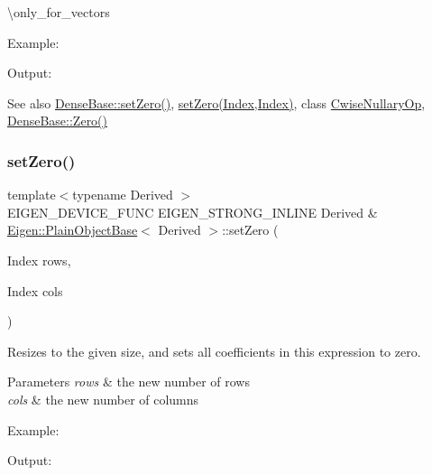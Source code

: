 \textbackslash{}only\+\_\+for\+\_\+vectors

Example\+: 
\begin{DoxyCodeInclude}{0}
\end{DoxyCodeInclude}
 Output\+: 
\begin{DoxyVerbInclude}
\end{DoxyVerbInclude}


\begin{DoxySeeAlso}{See also}
\mbox{\hyperlink{class_eigen_1_1_dense_base_ac74411ddeea2545bf20baf14613be47e}{Dense\+Base\+::set\+Zero()}}, \mbox{\hyperlink{class_eigen_1_1_plain_object_base_a4f7022ad80446854a068d4d3bfa98446}{set\+Zero(\+Index,\+Index)}}, class \mbox{\hyperlink{class_eigen_1_1_cwise_nullary_op}{Cwise\+Nullary\+Op}}, \mbox{\hyperlink{class_eigen_1_1_dense_base_a8c4be762b10041d64a2b2ce85bb14ba0}{Dense\+Base\+::\+Zero()}} 
\end{DoxySeeAlso}
\mbox{\label{class_eigen_1_1_plain_object_base_a4f7022ad80446854a068d4d3bfa98446}} 
\subsubsection{\texorpdfstring{setZero()}{setZero()}\hspace{0.1cm}{\footnotesize\ttfamily [2/2]}}
{\footnotesize\ttfamily template$<$typename Derived $>$ \\
E\+I\+G\+E\+N\+\_\+\+D\+E\+V\+I\+C\+E\+\_\+\+F\+U\+NC E\+I\+G\+E\+N\+\_\+\+S\+T\+R\+O\+N\+G\+\_\+\+I\+N\+L\+I\+NE Derived \& \mbox{\hyperlink{class_eigen_1_1_plain_object_base}{Eigen\+::\+Plain\+Object\+Base}}$<$ Derived $>$\+::set\+Zero (\begin{DoxyParamCaption}\item[{Index}]{rows,  }\item[{Index}]{cols }\end{DoxyParamCaption})}

Resizes to the given size, and sets all coefficients in this expression to zero.


\begin{DoxyParams}{Parameters}
{\em rows} & the new number of rows \\
\hline
{\em cols} & the new number of columns\\
\hline
\end{DoxyParams}
Example\+: 
\begin{DoxyCodeInclude}{0}
\end{DoxyCodeInclude}
 Output\+: 
\begin{DoxyVerbInclude}
\end{DoxyVerbInclude}


